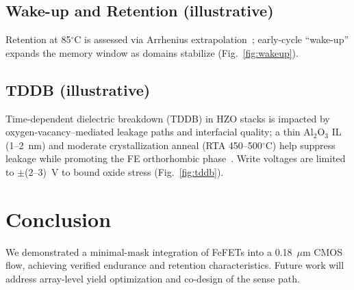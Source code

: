 \documentclass[conference]{IEEEtran}
\begin{document}
\subsection{Wake-up and Retention (illustrative)}
Retention at 85$^\circ$C is assessed via Arrhenius extrapolation~\cite{Yamazaki2018}; early-cycle ``wake-up'' expands the memory window as domains stabilize (Fig.~\ref{fig:wakeup}).

\subsection{TDDB (illustrative)}
Time-dependent dielectric breakdown (TDDB) in HZO stacks is impacted by oxygen-vacancy--mediated leakage paths and interfacial quality; a thin Al$_2$O$_3$ IL (1--2~nm) and moderate crystallization anneal (RTA 450--500$^\circ$C) help suppress leakage while promoting the FE orthorhombic phase~\cite{Mueller2015,Park2020}. Write voltages are limited to $\pm$(2--3)~V to bound oxide stress (Fig.~\ref{fig:tddb}).

\section{Conclusion}
We demonstrated a minimal-mask integration of FeFETs into a 0.18~$\mu$m CMOS flow, achieving verified endurance and retention characteristics. Future work will address array-level yield optimization and co-design of the sense path.

\IEEEtriggercmd{\enlargethispage{-1.2\baselineskip}}
\end{document}
